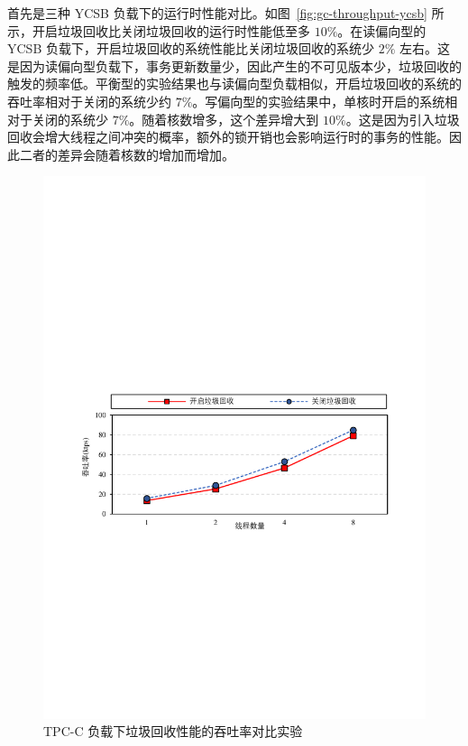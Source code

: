 首先是三种 YCSB 负载下的运行时性能对比。如图~\ref{fig:gc-throughput-ycsb} 所示，开启垃圾回收比关闭垃圾回收的运行时性能低至多 $10\%$。在读偏向型的 YCSB 负载下，开启垃圾回收的系统性能比关闭垃圾回收的系统少 $2\%$ 左右。这是因为读偏向型负载下，事务更新数量少，因此产生的不可见版本少，垃圾回收的触发的频率低。平衡型的实验结果也与读偏向型负载相似，开启垃圾回收的系统的吞吐率相对于关闭的系统少约 $7\%$。写偏向型的实验结果中，单核时开启的系统相对于关闭的系统少 $7\%$。随着核数增多，这个差异增大到 $10\%$。这是因为引入垃圾回收会增大线程之间冲突的概率，额外的锁开销也会影响运行时的事务的性能。因此二者的差异会随着核数的增加而增加。


\begin{figure}
    \centering
    \includegraphics[width=15cm, trim={1cm 9cm 1cm 10cm}]{figures/gc-tpcc-throughput.pdf}
    \caption{TPC-C 负载下垃圾回收性能的吞吐率对比实验}
    \label{fig:gc-throughput-tpcc}
\end{figure}


